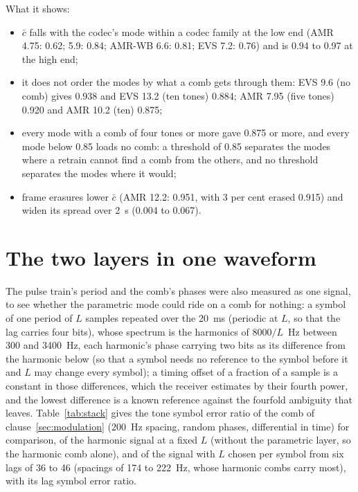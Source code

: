\begin{table}[htbp]
\caption{The parametric mode's autocorrelation by codec mode, against the tones a comb loads there}
\label{tab:pquality}
\centering\scriptsize
\resizebox{\textwidth}{!}{\tabpquality}
\end{table}

What it shows:
\begin{itemize}
\item $\bar c$ falls with the codec's mode within a codec family at the
  low end (AMR 4.75: 0.62; 5.9: 0.84; AMR-WB 6.6: 0.81; EVS 7.2: 0.76)
  and is 0.94 to 0.97 at the high end;
\item it does not order the modes by what a comb gets through them: EVS
  9.6 (no comb) gives 0.938 and EVS 13.2 (ten tones) 0.884; AMR 7.95
  (five tones) 0.920 and AMR 10.2 (ten) 0.875;
\item every mode with a comb of four tones or more gave 0.875 or more,
  and every mode below 0.85 loads no comb: a threshold of 0.85 separates
  the modes where a retrain cannot find a comb from the others, and no
  threshold separates the modes where it would;
\item frame erasures lower $\bar c$ (AMR 12.2: 0.951, with 3 per cent
  erased 0.915) and widen its spread over 2~s (0.004 to 0.067).
\end{itemize}

\section{The two layers in one waveform}\label{sec:stackmeas}
The pulse train's period and the comb's phases were also measured as one
signal, to see whether the parametric mode could ride on a comb for
nothing: a symbol of one period of $L$ samples repeated over the 20~ms
(periodic at $L$, so that the lag carries four bits), whose spectrum is
the harmonics of $8000/L$~Hz between 300 and 3400~Hz, each harmonic's
phase carrying two bits as its difference from the harmonic below (so
that a symbol needs no reference to the symbol before it and $L$ may
change every symbol); a timing offset of a fraction of a sample is a
constant in those differences, which the receiver estimates by their
fourth power, and the lowest difference is a known reference against
the fourfold ambiguity that leaves.  Table~\ref{tab:stack} gives the
tone symbol error ratio of the comb of clause~\ref{sec:modulation}
(200~Hz spacing, random phases, differential in time) for comparison, of
the harmonic signal at a fixed $L$ (without the parametric layer, so the
harmonic comb alone), and of the signal with $L$ chosen per symbol from
six lags of 36 to 46 (spacings of 174 to 222~Hz, whose harmonic combs
carry most), with its lag symbol error ratio.

